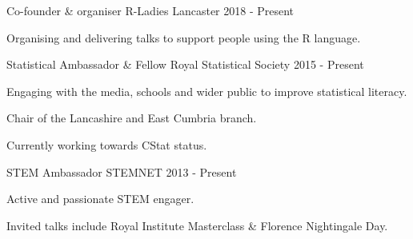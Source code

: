 \begin{cventries}

  \cventry
    {Co-founder \& organiser}
    {R-Ladies Lancaster}
    {}
    {2018 - Present}
    {
      \begin{cvitems}
        \item {Organising and delivering talks to support people using the R language.}
      \end{cvitems}
    }
  \cventry
    {Statistical Ambassador \& Fellow}
    {Royal Statistical Society}
    {}
    {2015 - Present}
    {
      \begin{cvitems}
        \item {Engaging with the media, schools and wider public to improve statistical literacy.}
        \item {Chair of the Lancashire and East Cumbria branch.}
        \item {Currently working towards CStat status.}
      \end{cvitems}
    }
    \cventry
    {STEM Ambassador}
    {STEMNET}
    {}
    {2013 - Present}
    {
      \begin{cvitems}
        \item {Active and passionate STEM engager.}
        \item{Invited talks include Royal Institute Masterclass \& Florence Nightingale Day.}
      \end{cvitems}
    }
\end{cventries}
